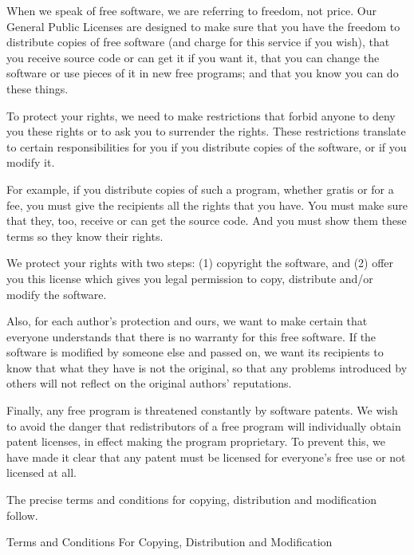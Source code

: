\documentclass{article}
\begin{document}
When we speak of free software, we are referring to freedom, not price.
Our General Public Licenses are designed to make sure that you have the
freedom to distribute copies of free software (and charge for this service
if you wish), that you receive source code or can get it if you want it,
that you can change the software or use pieces of it in new free programs;
and that you know you can do these things.

To protect your rights, we need to make restrictions that forbid anyone to
deny you these rights or to ask you to surrender the rights.  These
restrictions translate to certain responsibilities for you if you
distribute copies of the software, or if you modify it.

For example, if you distribute copies of such a program, whether gratis or
for a fee, you must give the recipients all the rights that you have.  You
must make sure that they, too, receive or can get the source code.  And
you must show them these terms so they know their rights.

We protect your rights with two steps: (1) copyright the software, and (2)
offer you this license which gives you legal permission to copy,
distribute and/or modify the software.

Also, for each author's protection and ours, we want to make certain that
everyone understands that there is no warranty for this free software.  If
the software is modified by someone else and passed on, we want its
recipients to know that what they have is not the original, so that any
problems introduced by others will not reflect on the original authors'
reputations.

Finally, any free program is threatened constantly by software patents.
We wish to avoid the danger that redistributors of a free program will
individually obtain patent licenses, in effect making the program
proprietary.  To prevent this, we have made it clear that any patent must
be licensed for everyone's free use or not licensed at all.

The precise terms and conditions for copying, distribution and
modification follow.

\begin{center}
{\Large \sc Terms and Conditions For Copying, Distribution and
  Modification}
\end{center}
\end{document}
